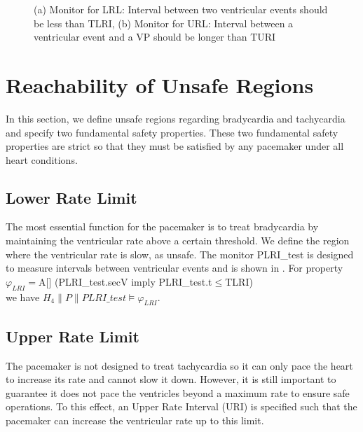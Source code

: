 \begin{figure}
\centering
	\caption{(a) Monitor for LRL: Interval between two ventricular events should be less than TLRI, (b) Monitor for URL: Interval between a ventricular event and a VP should be longer than TURI}
\end{figure} 
\section{Reachability of Unsafe Regions}
In this section, we define unsafe regions regarding bradycardia and tachycardia and specify two fundamental safety properties. These two fundamental safety properties are strict so that they must be satisfied by any pacemaker under all heart conditions. 

\subsection{Lower Rate Limit}
The most essential function for the pacemaker is to treat bradycardia by maintaining the ventricular rate above a certain threshold. We define the region where the ventricular rate is slow, as \textsf{unsafe}. The monitor \textsf{PLRI\_test} is designed to measure intervals between ventricular events and is shown in . For property \\
\textsf{$\varphi_{LRI}=$A[] (PLRI\_test.secV imply PLRI\_test.t$\leq$TLRI)}\\ we have $H_4\| P\| PLRI\_test\models\varphi_{LRI}$.

\subsection{Upper Rate Limit}
The pacemaker is not designed to treat tachycardia so it can only pace the heart to increase its rate and cannot slow it down. However, it is still important to guarantee it does not pace the ventricles beyond a maximum rate to ensure safe operations. To this effect, an Upper Rate Interval (URI) is specified such that the pacemaker can increase the ventricular rate up to this limit. 
  
